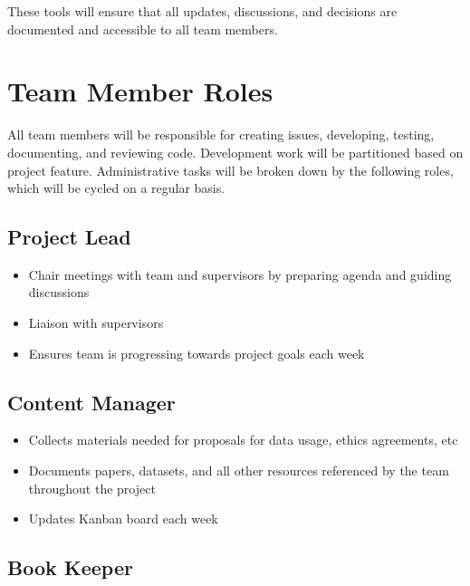\documentclass{article}
\begin{document}
These tools will ensure that all updates, discussions, and decisions are documented and accessible to all team members.

\section{Team Member Roles}


All team members will be responsible for creating issues, developing, testing, documenting, and reviewing code. Development work will be partitioned based on project feature. Administrative tasks will be broken down by the following roles, which will be cycled on a regular basis.

\subsection{Project Lead}

\begin{itemize}
  \item Chair meetings with team and supervisors by preparing agenda and guiding discussions
  \item Liaison with supervisors
  \item Ensures team is progressing towards project goals each week
\end{itemize}

\subsection{Content Manager}

\begin{itemize}
  \item Collects materials needed for proposals for data usage, ethics agreements, etc
  \item Documents papers, datasets, and all other resources referenced by the team throughout the project
  \item Updates Kanban board each week
\end{itemize}

\subsection{Book Keeper}
\end{document}
